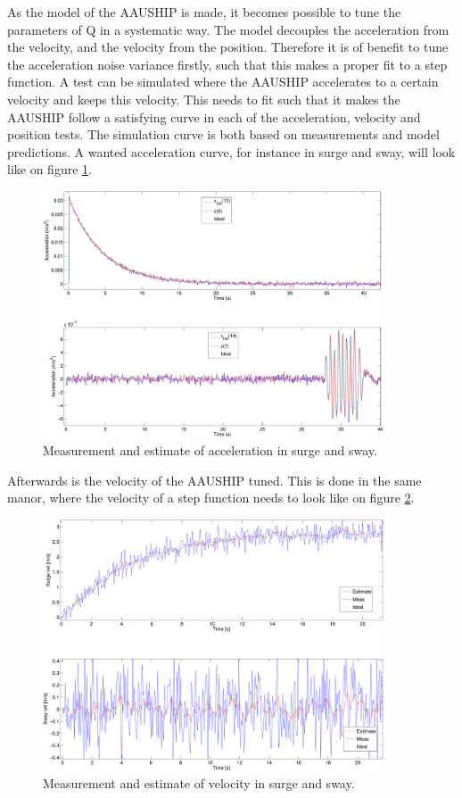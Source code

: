 As the model of the AAUSHIP is made, it becomes possible to tune the parameters of Q in a systematic way. The model decouples the acceleration from the velocity, and the velocity from the position. Therefore it is of benefit to tune the acceleration noise variance firstly, such that this makes a proper fit to a step function. A test can be simulated where the AAUSHIP accelerates to a certain velocity and keeps this velocity. This needs to fit such that it makes the AAUSHIP follow a satisfying curve in each of the acceleration, velocity and position tests. The simulation curve is both based on measurements and model predictions. A wanted acceleration curve, for instance in surge and sway, will look like on figure \ref{fig:uvacceltest}.
\begin{figure}
  \includegraphics[width=0.9\textwidth]{../../code/matlab/accel0,00001}
  \caption{Measurement and estimate of acceleration in surge and sway.}
  \label{fig:uvacceltest}
\end{figure}
Afterwards is the velocity of the AAUSHIP tuned. This is done in the same manor, where the velocity of a step function needs to look like on figure \ref{fig:uvtest}.
\begin{figure}
  \includegraphics[width=0.9\textwidth]{../../code/matlab/uv0,00001}
  \caption{Measurement and estimate of velocity in surge and sway.}
  \label{fig:uvtest}
\end{figure}
